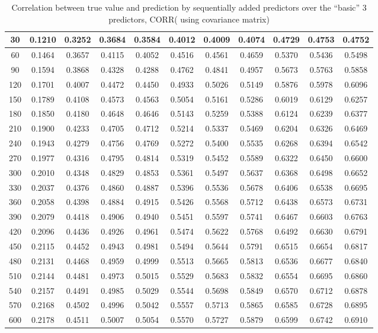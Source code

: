 \documentclass[12pt]{report}
\begin{document}
\begin{table}[h!]
{\begin{tabular}{||c c c c c c c c c c c||}
30 & 0.1210 & 0.3252 & 0.3684 & 0.3584 & 0.4012 & 0.4009 & 0.4074 & 0.4729 & 0.4753 & 0.4752 \\ \hline
        60 & 0.1464 & 0.3657 & 0.4115 & 0.4052 & 0.4516 & 0.4561 & 0.4659 & 0.5370 & 0.5436 & 0.5498 \\ \hline
        90 & 0.1594 & 0.3868 & 0.4328 & 0.4288 & 0.4762 & 0.4841 & 0.4957 & 0.5673 & 0.5763 & 0.5858 \\ \hline
        120 & 0.1701 & 0.4007 & 0.4472 & 0.4450 & 0.4933 & 0.5026 & 0.5149 & 0.5876 & 0.5978 & 0.6096 \\ \hline
        150 & 0.1789 & 0.4108 & 0.4573 & 0.4563 & 0.5054 & 0.5161 & 0.5286 & 0.6019 & 0.6129 & 0.6257 \\ \hline
        180 & 0.1850 & 0.4180 & 0.4648 & 0.4646 & 0.5143 & 0.5259 & 0.5388 & 0.6124 & 0.6239 & 0.6377 \\ \hline
        210 & 0.1900 & 0.4233 & 0.4705 & 0.4712 & 0.5214 & 0.5337 & 0.5469 & 0.6204 & 0.6326 & 0.6469 \\ \hline
        240 & 0.1943 & 0.4279 & 0.4756 & 0.4769 & 0.5272 & 0.5400 & 0.5535 & 0.6268 & 0.6394 & 0.6542 \\ \hline
        270 & 0.1977 & 0.4316 & 0.4795 & 0.4814 & 0.5319 & 0.5452 & 0.5589 & 0.6322 & 0.6450 & 0.6600 \\ \hline
        300 & 0.2010 & 0.4348 & 0.4829 & 0.4853 & 0.5361 & 0.5497 & 0.5637 & 0.6368 & 0.6498 & 0.6652 \\ \hline
        330 & 0.2037 & 0.4376 & 0.4860 & 0.4887 & 0.5396 & 0.5536 & 0.5678 & 0.6406 & 0.6538 & 0.6695 \\ \hline
        360 & 0.2058 & 0.4398 & 0.4884 & 0.4915 & 0.5426 & 0.5568 & 0.5712 & 0.6438 & 0.6573 & 0.6731 \\ \hline
        390 & 0.2079 & 0.4418 & 0.4906 & 0.4940 & 0.5451 & 0.5597 & 0.5741 & 0.6467 & 0.6603 & 0.6763 \\ \hline
        420 & 0.2096 & 0.4436 & 0.4926 & 0.4961 & 0.5474 & 0.5622 & 0.5768 & 0.6492 & 0.6630 & 0.6791 \\ \hline
        450 & 0.2115 & 0.4452 & 0.4943 & 0.4981 & 0.5494 & 0.5644 & 0.5791 & 0.6515 & 0.6654 & 0.6817 \\ \hline
        480 & 0.2131 & 0.4468 & 0.4959 & 0.4999 & 0.5513 & 0.5665 & 0.5813 & 0.6536 & 0.6677 & 0.6840 \\ \hline
        510 & 0.2144 & 0.4481 & 0.4973 & 0.5015 & 0.5529 & 0.5683 & 0.5832 & 0.6554 & 0.6695 & 0.6860 \\ \hline
        540 & 0.2157 & 0.4491 & 0.4985 & 0.5029 & 0.5544 & 0.5698 & 0.5849 & 0.6570 & 0.6712 & 0.6878 \\ \hline
        570 & 0.2168 & 0.4502 & 0.4996 & 0.5042 & 0.5557 & 0.5713 & 0.5865 & 0.6585 & 0.6728 & 0.6895 \\ \hline
        600 & 0.2178 & 0.4511 & 0.5007 & 0.5054 & 0.5570 & 0.5727 & 0.5879 & 0.6599 & 0.6742 & 0.6910 \\ \hline
 \end{tabular}}
\caption{Correlation between true value and prediction by sequentially added predictors over the “basic” 3 predictors, CORR( using covariance matrix)}
\label{table:CORRcov}
\end{table}
%
%
%
\end{document}
